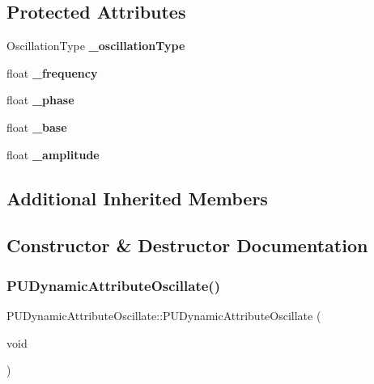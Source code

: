 \subsection*{Protected Attributes}
\begin{DoxyCompactItemize}
\item 
\mbox{\label{classPUDynamicAttributeOscillate_a99fe62fc9208c05bece432956f5cfa05}} 
Oscillation\+Type {\bfseries \+\_\+oscillation\+Type}
\item 
\mbox{\label{classPUDynamicAttributeOscillate_a59bc1615bc2f970785516283cfcc392a}} 
float {\bfseries \+\_\+frequency}
\item 
\mbox{\label{classPUDynamicAttributeOscillate_afec73ce08064daba68585935833c72d3}} 
float {\bfseries \+\_\+phase}
\item 
\mbox{\label{classPUDynamicAttributeOscillate_a9ddc6aa14ace2435404e298004900687}} 
float {\bfseries \+\_\+base}
\item 
\mbox{\label{classPUDynamicAttributeOscillate_a078615fe13630932f93f06cc858a088e}} 
float {\bfseries \+\_\+amplitude}
\end{DoxyCompactItemize}
\subsection*{Additional Inherited Members}


\subsection{Constructor \& Destructor Documentation}
\mbox{\label{classPUDynamicAttributeOscillate_a61d288747e43dd28f86d99cb20595043}} 
\subsubsection{\texorpdfstring{P\+U\+Dynamic\+Attribute\+Oscillate()}{PUDynamicAttributeOscillate()}\hspace{0.1cm}{\footnotesize\ttfamily [1/4]}}
{\footnotesize\ttfamily P\+U\+Dynamic\+Attribute\+Oscillate\+::\+P\+U\+Dynamic\+Attribute\+Oscillate (\begin{DoxyParamCaption}\item[{void}]{ }\end{DoxyParamCaption})}


